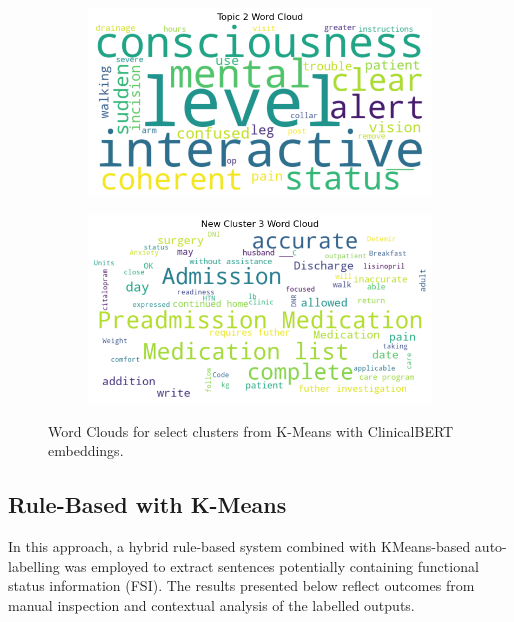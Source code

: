 \begin{figure}[H]
\centering
\begin{subfigure}{0.45\textwidth}
  \centering
  \includegraphics[width=\linewidth]{images/Unsupervised_Results/wordcloud_cluster_1.png}
\end{subfigure}
\hfill
\begin{subfigure}{0.45\textwidth}
  \centering
  \includegraphics[width=\linewidth]{images/Unsupervised_Results/wordcloud_cluster_3.png}
\end{subfigure}
\caption{Word Clouds for select clusters from K-Means with ClinicalBERT embeddings.}
\label{fig:lda-kmeans-wordclouds-1-3}
\end{figure}

\subsection{Rule-Based with K-Means}

In this approach, a hybrid rule-based system combined with KMeans-based auto-labelling was employed to extract sentences potentially containing functional status information (FSI). The results presented below reflect outcomes from manual inspection and contextual analysis of the labelled outputs.

